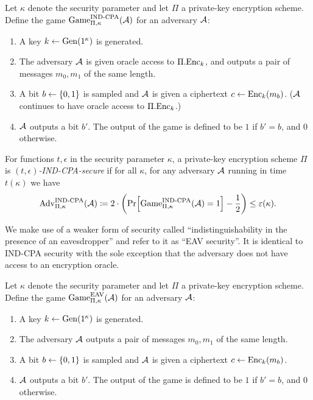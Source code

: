 \begin{definition}
	Let $\kappa$ denote the security parameter and let $\Pi$ a private-key encryption scheme. Define the game $\mathrm{Game}_{\Pi, \kappa}^{\mathrm{IND\text{-}CPA}}(\mathcal{A})$ for an adversary $\mathcal{A}$:
	\begin{enumerate}[1.]
		\item A key $k \leftarrow \mathrm{Gen}(1^\kappa)$ is generated.
		\item The adversary $\mathcal{A}$ is given oracle access to $\Pi.\mathrm{Enc}_k$, and outputs a pair of messages $m_0, m_1$ of the same length.
		\item A bit $b \leftarrow \{0, 1\}$ is sampled and $\mathcal{A}$ is given a ciphertext $c \leftarrow \mathrm{Enc}_k(m_b)$. ($\mathcal{A}$ continues to have oracle access to $\Pi.\mathrm{Enc}_k$.)
		\item $\mathcal{A}$ outputs a bit $b'$. The output of the game is defined to be $1$ if $b' = b$, and $0$ otherwise.
	\end{enumerate}
\end{definition}

\begin{definition}
	For functions $t, \epsilon$ in the security parameter $\kappa$, a private-key encryption scheme $\Pi$ is \emph{$(t, \epsilon)$-IND-CPA-secure} if for all $\kappa$, for any adversary $\mathcal{A}$ running in time $t(\kappa)$ we have
	\begin{align*}
		\advantage{\Pi}{\kappa}{IND\text{-}CPA}(\adv) \coloneqq 2 \cdot \left(\pr{\game{\Pi}{\kappa}{IND\text{-}CPA}(\adv) = 1} - \frac{1}{2}\right) \le \epsilon(\kappa).
	\end{align*}
\end{definition}

We make use of a weaker form of security called ``indistinguishability in the presence of an eavesdropper'' \cite{introduction-to-modern-cryptography} and refer to it as ``EAV security''. It is identical to IND-CPA security with the sole exception that the adversary does not have access to an encryption oracle.

\begin{definition}
	Let $\kappa$ denote the security parameter and let $\Pi$ a private-key encryption scheme. Define the game $\mathrm{Game}_{\Pi, \kappa}^{\mathrm{EAV}}(\mathcal{A})$ for an adversary $\mathcal{A}$:
	\begin{enumerate}[1.]
		\item A key $k \leftarrow \mathrm{Gen}(1^\kappa)$ is generated.
		\item The adversary $\mathcal{A}$ outputs a pair of messages $m_0, m_1$ of the same length.
		\item A bit $b \leftarrow \{0, 1\}$ is sampled and $\mathcal{A}$ is given a ciphertext $c \leftarrow \mathrm{Enc}_k(m_b)$.
		\item $\mathcal{A}$ outputs a bit $b'$. The output of the game is defined to be $1$ if $b' = b$, and $0$ otherwise.
	\end{enumerate}
\end{definition}

